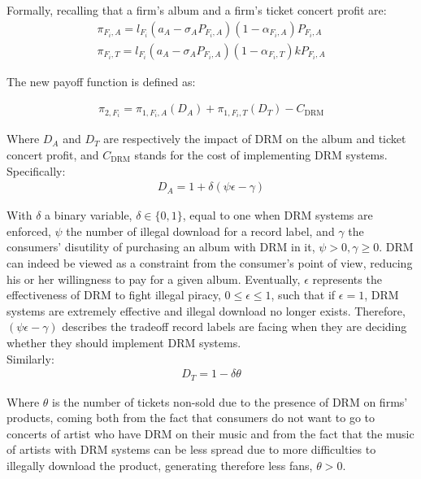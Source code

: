 \documentclass[a4paper,12pt]{article}
\numberwithin{equation}{section}
\newcommand{\drm}{\text{DRM}}
\newcommand{\firmpayoff}[2]{\pi_{{#1}, F_{#2}}}
\newcommand{\firmalbum}[2]{\pi_{#1, F_{#2}, A}}
\newcommand{\firmticket}[2]{\pi_{#1, F_{#2}, T}}
\newcommand{\drminf}{(\psi \epsilon - \gamma)}
\begin{document}
Formally, recalling that a firm’s album and a firm’s ticket concert profit are:
\begin{eqnarray}
\pi_{F_i, A} = l_{F_i} (a_A - \sigma_A P_{F_i, A})(1 - \alpha_{F_i, A}) P_{F_i, A}\\
\pi_{F_i, T} = l_{F_i} (a_A - \sigma_A P_{F_i, A})(1 - \alpha_{F_i, T}) k P_{F_i, A}
\end{eqnarray}

The new payoff function is defined as:

\begin{eqnarray}
\firmpayoff{2}{i} = \firmalbum{1}{i} (D_A) + \firmticket{1}{i}  (D_T) - C_{\drm}
\label{Eq:FirmTotalPayoffDRM}
\end{eqnarray}

Where $D_A$ and $D_T$ are respectively the impact of DRM on the album and ticket concert profit, and $C_{\drm}$ stands for the cost of implementing DRM systems. Specifically:
\begin{eqnarray}
D_A = 1 + \delta \drminf
\label{Eq:DA}
\end{eqnarray}

With $\delta$ a binary variable, $\delta \in \{0, 1\}$, equal to one when DRM systems are enforced, $\psi$ the number of illegal download for a record label, and $\gamma$ the consumers’ disutility of purchasing an album with DRM in it, $\psi > 0, \gamma \geq 0$. DRM can indeed be viewed as a constraint from the consumer’s point of view, reducing his or her willingness to pay for a given album. Eventually, $\epsilon$ represents the effectiveness of DRM to fight illegal piracy, $0 \leq \epsilon \leq 1$, such that if $\epsilon = 1$, DRM systems are extremely effective and illegal download no longer exists. Therefore, $\drminf$ describes the tradeoff record labels are facing when they are deciding whether they should implement DRM systems.\\

Similarly:
\begin{eqnarray}
D_T = 1 - \delta \theta
\label{Eq:DT}
\end{eqnarray}

Where $\theta$ is the number of tickets non-sold due to the presence of DRM on firms’ products, coming both from the fact that consumers do not want to go to concerts of artist who have DRM on their music and from the fact that the music of artists with DRM systems can be less spread due to more difficulties to illegally download the product, generating therefore less fans, $\theta > 0$.\\
\end{document}

